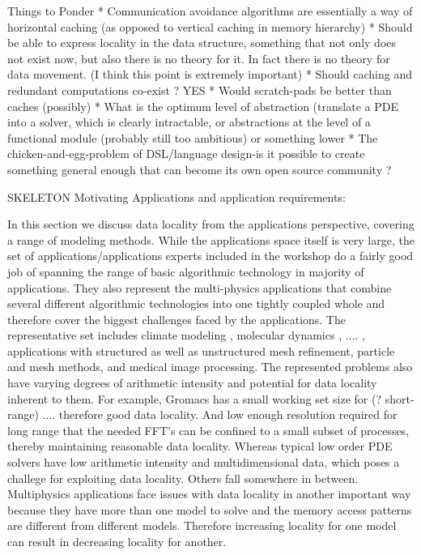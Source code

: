 Things to Ponder
* Communication avoidance algorithms are essentially a way of
  horizontal caching (as opposed to vertical caching in memory
  hierarchy) 
* Should be able to express locality in the data structure, something
  that not only does not exist now, but also there is no theory for
  it. In fact there is no theory for data movement. (I think this
  point is extremely important)
* Should caching and redundant computations co-exist ? YES
* Would scratch-pads be better than caches (possibly)
* What is the optimum level of abstraction (translate a PDE into a
   solver, which is clearly intractable, or abstractions at the level
   of a functional module (probably still too ambitious) or something
   lower 
* The chicken-and-egg-problem of DSL/language design-is it possible to
   create something general enough that can become its own open source
   community ?



SKELETON
Motivating Applications and application requirements:

In this section we discuss data locality from the applications
perspective, covering a range of modeling methods. While the
applications space itself is very large, the set of
applications/applications experts included in the workshop do a fairly
good job of spanning the range of basic algorithmic technology in
majority of applications. They also represent the multi-physics
applications that combine several different algorithmic technologies
into one tightly coupled whole and therefore cover the biggest
challenges faced by the applications. The representative set
includes climate modeling \cite{cosmo},  molecular dynamics
\cite{gromacs}, .... , applications with structured \cite{chombo}  as well as
unstructured \cite{}  mesh refinement, particle and mesh methods, and
medical image processing. The represented problems also have varying degrees
of arithmetic intensity and potential for data locality inherent to
them. For example, Gromacs has a small working set size for (?
short-range) .... therefore good data locality. And low enough
resolution required for long range that the needed FFT's can be
confined to a small subset of processes, thereby maintaining
reasonable data locality. Whereas typical low order PDE solvers have
low arithmetic intensity and multidimensional data, which poses a
challege for exploiting data locality. Others fall somewhere in between.
Multiphysics applications face issues with data locality in another
important way because they have more than one model to solve and the  
memory access patterns are different from different models. Therefore
increasing locality for one model can result in decreasing locality
for another. 

